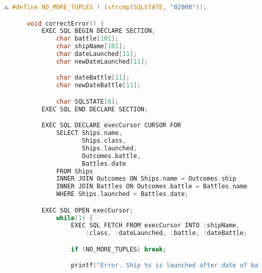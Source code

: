 \documentclass[12pt]{article}
\begin{document}
\begin{enumerate}[1.]
\begin{enumerate}[a)]
\begin{lstlisting}[language=c]
        printf("Enter name of displacement:\n");
        scanf("%d", &displacement);

        printf("Enter name of ship (if first ship, skip by pressing ENTER):\n");
        fgets(shipName, sizeof shipName,stdin);

        if (shipName[0] == '\n') {
            strncpy(shipName, class, sizeof(class));
        }

        printf("Enter date launched (YYYY-MM-DD):\n");
        scanf("%s", dateLaunched);

        EXEC SQL INSERT INTO Classes(class, type, country, numGuns, bore, displacement)
                 VALUES (:class, :type, :country, :numGuns, :bore, :displacement);

        EXEC SQL INSERT INTO Ships(name, class, launched)
                 VALUES (:shipName, :class, :dateLaunched);
    }
    \end{lstlisting}

        \item

    \begin{lstlisting}[language=c]
    #define NO_MORE_TUPLES ! (strcmp(SQLSTATE, "02000"));

    void correctError() {
        EXEC SQL BEGIN DECLARE SECTION;
            char battle[101];
            char shipName[101];
            char dateLaunched[11];
            char newDateLaunched[11];

            char dateBattle[11];
            char newDateBattle[11];

            char SQLSTATE[6];
        EXEC SQL END DECLARE SECTION;

        EXEC SQL DECLARE execCursor CURSOR FOR
            SELECT Ships.name,
                   Ships.class,
                   Ships.launched,
                   Outcomes.battle,
                   Battles.date
            FROM Ships
            INNER JOIN Outcomes ON Ships.name = Outcomes.ship
            INNER JOIN Battles ON Outcomes.battle = Battles.name
            WHERE Ships.launched > Battles.date;

        EXEC SQL OPEN execCursor;
            while(1) {
                EXEC SQL FETCH FROM execCursor INTO :shipName,
                    :class, :dateLaunched, :battle, :dateBattle;

                if (NO_MORE_TUPLES) break;

                printf("Error. Ship %s is launched after date of battle.\n");


\end{lstlisting}
\end{enumerate}
\end{enumerate}
\end{document}
